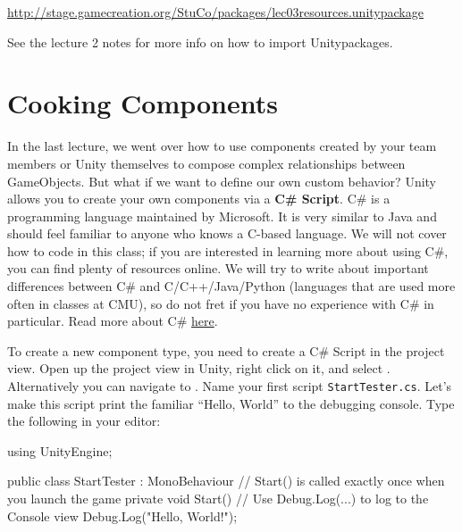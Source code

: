 \documentclass[11pt]{article}
\def\StartLineAt#1{\lstset{firstnumber=#1}}
\begin{document}
\begin{center}
\href{http://stage.gamecreation.org/StuCo/packages/lec03resources.unitypackage}{http://stage.gamecreation.org/StuCo/packages/lec03resources.unitypackage}
\end{center}

\noindent See the lecture 2 notes for more info on how to import Unitypackages.

\pagebreak

\section{Cooking Components}

In the last lecture, we went over how to use components created by your team members or Unity 
themselves to compose complex relationships between GameObjects.  But what if we want to define our 
own custom behavior?  Unity allows you to create your own components via a \textbf{C\# Script}.  C\# 
is a programming language maintained by Microsoft.  It is very similar to Java and should feel 
familiar to anyone who knows a C-based language.  We will not cover how to code in this class; if 
you are interested in learning more about using C\#, you can find plenty of resources online.
We will try to write about important differences between C\# and C/C++/Java/Python (languages that
are used more often in classes at CMU), so do not fret if you have no experience with C\# in particular.
Read more about C\# \href{https://docs.microsoft.com/en-us/dotnet/csharp/}{here}.

To create a new component type, you need to create a C\# Script in the project view.  Open up the 
project view in Unity, right click on it, and select .  Alternatively you 
can navigate to .  Name your first script
\lstinline|StartTester.cs|.  Let's make this script print the familiar ``Hello, World'' to the 
debugging console.  Type the following in your editor:

\StartLineAt{1}
\begin{csharp}
using UnityEngine;

public class StartTester : MonoBehaviour
{
    // Start() is called exactly once when you launch the game
    private void Start()
    {
        // Use Debug.Log(...) to log to the Console view
        Debug.Log("Hello, World!");
    }
}
\end{csharp}
\end{document}
